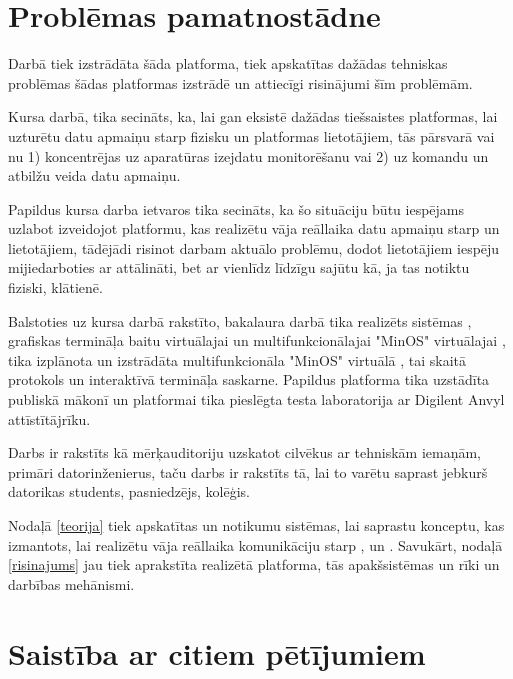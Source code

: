 \section{Problēmas pamatnostādne}

Darbā tiek izstrādāta šāda platforma, tiek apskatītas dažādas tehniskas
problēmas šādas platformas izstrādē un attiecīgi risinājumi šīm problēmām. 

Kursa darbā, tika secināts, ka, lai gan eksistē dažādas tiešsaistes platformas,
lai uzturētu datu apmaiņu starp fizisku  un platformas
lietotājiem, tās pārsvarā vai nu 1) koncentrējas uz aparatūras izejdatu
monitorēšanu vai 2) uz komandu un atbilžu veida datu apmaiņu.
\cite[para. 3]{VeinbahsKrisjanis2021}

Papildus kursa darba ietvaros tika secināts, ka šo situāciju būtu iespējams
uzlabot izveidojot platformu, kas realizētu vāja reāllaika datu apmaiņu starp
 un lietotājiem, tādējādi risinot darbam aktuālo
problēmu, dodot lietotājiem iespēju mijiedarboties ar 
attālināti, bet ar vienlīdz līdzīgu sajūtu kā, ja tas notiktu fiziski, klātienē.
\cite[para. 5]{VeinbahsKrisjanis2021} 

Balstoties uz kursa darbā rakstīto, bakalaura darbā tika realizēts sistēmas
, grafiskas termināļa
 baitu virtuālajai
 un multifunkcionālajai "MinOS" virtuālajai
, tika izplānota un izstrādāta multifunkcionāla "MinOS" virtuālā
, tai skaitā protokols un interaktīvā termināļa saskarne. Papildus
platforma tika uzstādīta publiskā mākonī un platformai tika pieslēgta testa
laboratorija ar Digilent Anvyl attīstītājrīku.

Darbs ir rakstīts kā mērķauditoriju uzskatot cilvēkus ar tehniskām iemaņām,
primāri datorinženierus, taču darbs ir rakstīts tā, lai to varētu saprast
jebkurš datorikas students, pasniedzējs, kolēģis.

Nodaļā \ref{teorija} tiek apskatītas  un
notikumu sistēmas, lai saprastu konceptu, kas izmantots, lai realizētu vāja
reāllaika komunikāciju starp ,
 un . Savukārt, nodaļā
\ref{risinajums} jau tiek aprakstīta realizētā platforma, tās apakšsistēmas un
rīki un darbības mehānismi.

\section{Saistība ar citiem pētījumiem}

